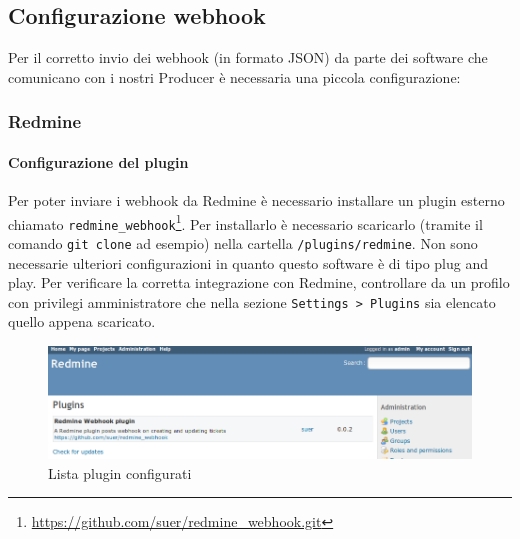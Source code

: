 \subsection{Configurazione webhook}
Per il corretto invio dei webhook (in formato JSON) da parte dei software che comunicano con i nostri Producer è necessaria una piccola configurazione:
	
	\subsubsection{Redmine}
	\paragraph{Configurazione del plugin}
	Per poter inviare i webhook da Redmine è necessario installare un plugin esterno chiamato \texttt{redmine\_webhook}\footnote{\url{https://github.com/suer/redmine_webhook.git}}.
	Per installarlo è necessario scaricarlo (tramite il comando \texttt{git clone} ad esempio) nella cartella \texttt{/plugins/redmine}.
	Non sono necessarie ulteriori configurazioni in quanto questo software è di tipo plug and play. %
	Per verificare la corretta integrazione con Redmine, controllare da un profilo con privilegi amministratore che nella sezione \texttt{Settings > Plugins} sia elencato quello appena scaricato.
	\begin{figure}[H]
		\centering
		\includegraphics[width=13cm]{img/redmine_webhook_admin.png}
		\caption{Lista plugin configurati}
	\end{figure}


